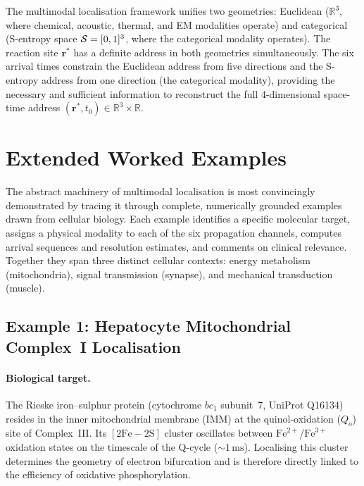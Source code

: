 \begin{remark}
The multimodal localisation framework unifies two geometries: Euclidean
($\mathbb{R}^3$, where chemical, acoustic, thermal, and EM modalities operate)
and categorical (S-entropy space $\mathcal{S} = [0,1]^3$, where the categorical
modality operates).  The reaction site $\mathbf{r}^*$ has a definite address
in both geometries simultaneously.  The six arrival times constrain the
Euclidean address from five directions and the S-entropy address from one
direction (the categorical modality), providing the necessary and sufficient
information to reconstruct the full 4-dimensional space-time address
$(\mathbf{r}^*, t_0) \in \mathbb{R}^3 \times \mathbb{R}$.
\end{remark}

\section{Extended Worked Examples}
\label{sec:ch06-worked-examples-extended}

The abstract machinery of multimodal localisation is most convincingly
demonstrated by tracing it through complete, numerically grounded examples
drawn from cellular biology.  Each example identifies a specific molecular
target, assigns a physical modality to each of the six propagation channels,
computes arrival sequences and resolution estimates, and comments on clinical
relevance.  Together they span three distinct cellular contexts: energy
metabolism (mitochondria), signal transmission (synapse), and mechanical
transduction (muscle).

\subsection{Example 1: Hepatocyte Mitochondrial Complex~I Localisation}
\label{sec:ch06-example-complex-I}

\paragraph{Biological target.}
The Rieske iron--sulphur protein (cytochrome $bc_1$ subunit~7, UniProt
Q16134) resides in the inner mitochondrial membrane (IMM) at the
quinol-oxidation ($Q_o$) site of Complex~III.  Its $[2\text{Fe}{-}2\text{S}]$
cluster oscillates between $\text{Fe}^{2+}$/$\text{Fe}^{3+}$ oxidation states
on the timescale of the Q-cycle (${\sim}1\,\text{ms}$).  Localising this
cluster determines the geometry of electron bifurcation and is therefore
directly linked to the efficiency of oxidative phosphorylation.

